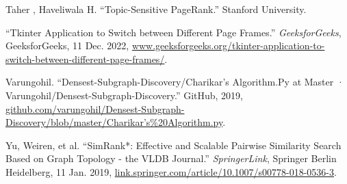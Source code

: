 \documentclass[fontsize=11pt]{article}
\begin{document}
\par Taher , Haveliwala H. “Topic-Sensitive PageRank.” Stanford University.

\par “Tkinter Application to Switch between Different Page Frames.” \textit{GeeksforGeeks}, GeeksforGeeks, 11 Dec. 2022, \url{www.geeksforgeeks.org/tkinter-application-to-switch-between-different-page-frames/}.

\par Varungohil. “Densest-Subgraph-Discovery/Charikar’s Algorithm.Py at Master · Varungohil/Densest-Subgraph-Discovery.” GitHub, 2019, \\ \url{github.com/varungohil/Densest-Subgraph-Discovery/blob/master/Charikar’s%20Algorithm.py}.

\par Yu, Weiren, et al. “SimRank*: Effective and Scalable Pairwise Similarity Search Based on Graph Topology - the VLDB Journal.” \textit{SpringerLink}, Springer Berlin Heidelberg, 11 Jan. 2019, \url{link.springer.com/article/10.1007/s00778-018-0536-3}. 
\end{document}
